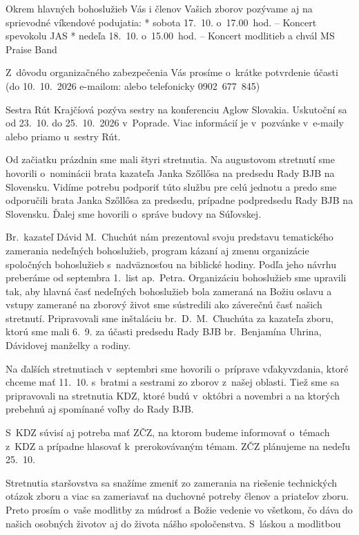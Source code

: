 Okrem hlavných bohoslužieb Vás i členov Vašich zborov pozývame aj na sprievodné víkendové podujatia:
\begitems
* sobota 17.~10. o~17.00~hod. -- Koncert spevokolu JAS
* nedeľa 18.~10. o~15.00~hod. -- Koncert modlitieb a chvál MS Praise Band
\enditems

Z~dôvodu organizačného zabezpečenia Vás prosíme o~krátke potvrdenie účasti
(do 10.~10.~2026 e-mailom:  alebo telefonicky 0902~677~845)



Sestra Rút Krajčíová pozýva sestry na konferenciu Aglow Slovakia.
Uskutoční sa od 23.~10. do 25.~10.~2026 v~Poprade. Viac informácií je v~pozvánke v~e-maily alebo priamo u~sestry Rút.




Od začiatku prázdnin sme mali štyri stretnutia.
Na augustovom stretnutí sme hovorili o~nominácii brata kazateľa Janka Szőllősa na predsedu Rady BJB na Slovensku. Vidíme potrebu podporiť túto službu pre celú jednotu a predo sme odporučili brata Janka Szőllősa za predsedu, prípadne podpredsedu Rady BJB na Slovensku.
Ďalej sme hovorili o~správe budovy na Súľovskej.

Br.~kazateľ Dávid M.~Chuchút nám prezentoval svoju predstavu tematického zamerania nedeľných bohoslužieb, program kázaní aj zmenu organizácie spoločných bohoslužieb s~nadväznosťou na biblické hodiny. Podľa jeho návrhu preberáme od septembra 1.~list ap.~Petra. Organizáciu bohoslužieb sme upravili tak, aby hlavná časť nedeľných bohoslužieb bola zameraná na Božiu oslavu a vstupy zamerané na zborový život sme sústredili ako záverečnú časť našich stretnutí.
Pripravovali sme inštaláciu br.~D.~M.~Chuchúta za kazateľa zboru, ktorú sme mali 6.~9. za účasti predsedu Rady BJB br.~Benjamína Uhrina, Dávidovej manželky a rodiny.

Na ďalších stretnutiach v~septembri sme hovorili o~príprave vďakyvzdania, ktoré chceme mať 11.~10. s~bratmi a sestrami zo zborov z~našej oblasti.
Tiež sme sa pripravovali na stretnutia KDZ, ktoré budú v~októbri a novembri a na ktorých prebehnú aj spomínané voľby do Rady BJB.

S~KDZ súvisí aj potreba mať ZČZ, na ktorom budeme informovať o~témach z~KDZ a prípadne hlasovať k~prerokovávaným témam. ZČZ plánujeme na nedeľu 25.~10.

Stretnutia staršovstva sa snažíme zmeniť zo zamerania na riešenie technických otázok zboru a viac sa zameriavať na duchovné potreby členov a priateľov zboru.
Preto prosím o~vaše modlitby za múdrosť a Božie vedenie vo všetkom, čo dáva do našich osobných životov aj do života nášho spoločenstva.
S~láskou a modlitbou



